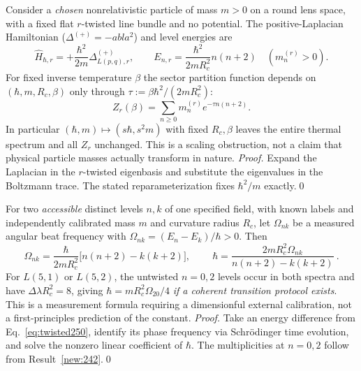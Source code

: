 \begin{result}\label{new:250}
Consider a \emph{chosen} nonrelativistic particle of mass $m>0$ on a round lens space, with a fixed flat $r$-twisted line bundle and no potential. The positive-Laplacian Hamiltonian ($\Delta^{(+)}=-
abla^2$) and level energies are
\begin{equation}\label{eq:twisted250}
 \widehat H_{\hbar,r}=+\frac{\hbar^2}{2m}\Delta^{(+)}_{L(p,q),r},\qquad
 E_{n,r}=\frac{\hbar^2}{2mR_c^2}n(n+2)\quad(m_n^{(r)}>0).
\end{equation}
For fixed inverse temperature $\beta$ the sector partition function depends on $(\hbar,m,R_c,\beta)$ only through $\tau:=\beta\hbar^2/(2mR_c^2)$:
\begin{equation}\label{eq:twisted250b}
 Z_r(\beta)=\sum_{n\ge0}m_n^{(r)}e^{-\tau n(n+2)}.
\end{equation}
In particular $(\hbar,m)\mapsto(s\hbar,s^2m)$ with fixed $R_c,\beta$ leaves the entire thermal spectrum and all $Z_r$ unchanged. This is a scaling obstruction, not a claim that physical particle masses actually transform in nature.
\textit{Proof.} Expand the Laplacian in the $r$-twisted eigenbasis and substitute the eigenvalues in the Boltzmann trace. The stated reparameterization fixes $\hbar^2/m$ exactly.\qed
\end{result}

\begin{result}\label{new:251}
For two \emph{accessible} distinct levels $n,k$ of one specified field, with known labels and independently calibrated mass $m$ and curvature radius $R_c$, let $\Omega_{nk}$ be a measured angular beat frequency with $\Omega_{nk}=(E_n-E_k)/\hbar>0$. Then
\begin{equation}\label{eq:twisted251}
 \Omega_{nk}=\frac{\hbar}{2mR_c^2}\big[n(n+2)-k(k+2)\big],\qquad
 \boxed{\ \hbar=\frac{2mR_c^2\Omega_{nk}}{n(n+2)-k(k+2)}\ }.
\end{equation}
For $L(5,1)$ or $L(5,2)$, the untwisted $n=0,2$ levels occur in both spectra and have $\Delta\lambda R_c^2=8$, giving $\hbar=mR_c^2\Omega_{20}/4$ \emph{if a coherent transition protocol exists}. This is a measurement formula requiring a dimensionful external calibration, not a first-principles prediction of the constant.
\textit{Proof.} Take an energy difference from Eq.~\eqref{eq:twisted250}, identify its phase frequency via Schr\"odinger time evolution, and solve the nonzero linear coefficient of $\hbar$. The multiplicities at $n=0,2$ follow from Result~\ref{new:242}.\qed
\end{result}

